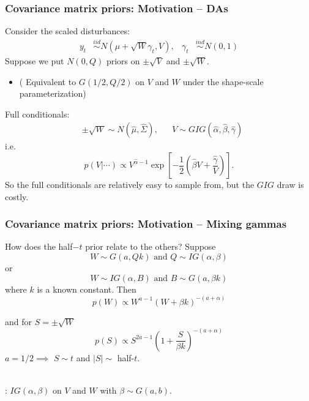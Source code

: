 \documentclass[xcolor=dvipsnames]{beamer}
\begin{document}
\begin{frame}
\frametitle{Covariance matrix priors: Motivation -- DAs}
Consider the scaled disturbances:
\begin{align*}
 y_t &\stackrel{iid}{\sim} N(\mu + \sqrt{W}\gamma_t, V), &\gamma_t &\stackrel{ind}{\sim} N(0,1)
\end{align*}
Suppose we put $N(0,Q)$ priors on $\pm\sqrt{V}$ and $\pm\sqrt{W}$.
\begin{itemize}
\item[]( Equivalent to $G(1/2, Q/2)$ on $V$ and $W$ under the shape-scale parameterization)
\end{itemize}

\pause
Full conditionals:
\begin{align*}
&\pm\sqrt{W}\sim N(\hat{\mu},\hat{\Sigma}), &&V\sim GIG(\hat{\alpha},\hat{\beta},\hat{\gamma})
\end{align*}
i.e. 
\[
p(V|\cdots)\propto V^{\hat{\alpha} -1}\exp\left[-\frac{1}{2}\left(\hat{\beta} V + \frac{\hat{\gamma}}{V}\right)\right].
\]
 So the full conditionals are relatively easy to sample from, but the $GIG$ draw is costly.
\end{frame}



\begin{frame}
\frametitle{Covariance matrix priors: Motivation -- Mixing gammas}
How does the half$-t$ prior relate to the others? Suppose
\[
W\sim G(a,Qk) \mbox{ and } Q\sim IG(\alpha,\beta)
\]
or
\[
W\sim IG(\alpha, B) \mbox{ and } B\sim G(a,\beta k)
\]
where $k$ is a known constant. \pause Then
\[
p(W) \propto W^{a-1}(W + \beta k)^{-(a + \alpha)}
\]

and for $S=\pm\sqrt{W}$
\[
p(S) \propto S^{2a-1}\left(1 + \frac{S}{\beta k}\right)^{-(a + \alpha)}
\]
$a=1/2 \implies $ $S\sim t$ and $|S| \sim$ half-$t$.\\~

\pause \citet{huang2013simple}: $IG(\alpha,\beta)$ on $V$ and $W$ with $\beta\sim G(a,b)$.
\end{frame}
\end{document}
